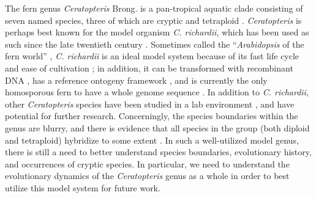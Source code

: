 \documentclass[12pt]{article}
\begin{document}
\begin{flushleft}
The fern genus \textit{Ceratopteris} Brong. is a pan-tropical aquatic clade consisting of seven named species, three of which are cryptic and tetraploid \autocite{PPGI, LloydTax1974, Masuyama2010}. \textit{Ceratopteris} is perhaps best known for the model organism \textit{C. richardii}, which has been used as such since the late twentieth century \autocite{Banks1994, hickock1987, Hickok1995}. Sometimes called the ``\textit{Arabidopsis} of the fern world'' \autocite{Sessa2014}, \textit{C. richardii} is an ideal model system because of its fast life cycle and ease of cultivation \autocite{hickock1987}; in addition, it can be transformed with recombinant DNA \autocite{Muthukumar2013, Plackett2014}, has a reference ontogeny framework \autocite{Conway2019-cd}, and is currently the only homosporous fern to have a whole genome sequence \autocite{Marchant2019}. In addition to \textit{C. richardii}, other \textit{Ceratopteris} species have been studied in a lab environment \autocite{hickok1974, Hickok1977}, and have potential for further research. Concerningly, the species boundaries within the genus are blurry, and there is evidence that all species in the group (both diploid and tetraploid) hybridize to some extent \autocite{Adjie2007, hickok1974, Hickok1977, Hickok1979, LloydTax1974}. In such a well-utilized model genus, there is still a need to better understand species boundaries, evolutionary history, and occurrences of cryptic species. In particular, we need to understand the evolutionary dynamics of the \textit{Ceratopteris} genus as a whole in order to best utilize this model system for future work. 


\end{flushleft}
\end{document}
